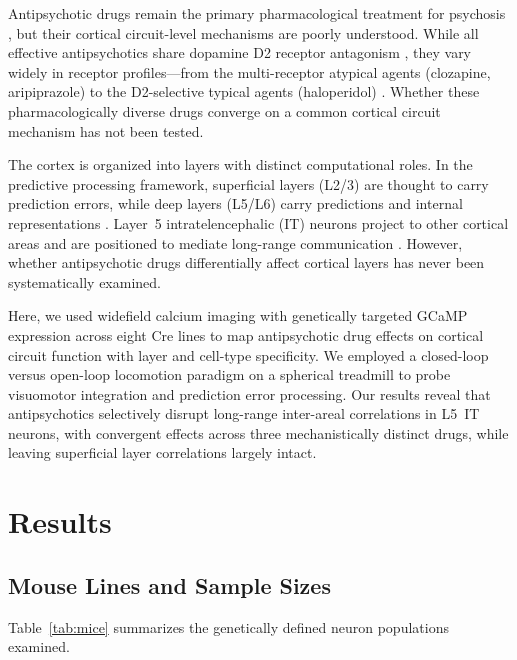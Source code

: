 \documentclass[11pt]{article}
\begin{document}
Antipsychotic drugs remain the primary pharmacological treatment for psychosis \citep{leucht2013comparative}, but their cortical circuit-level mechanisms are poorly understood. While all effective antipsychotics share dopamine D2 receptor antagonism \citep{creese1976dopamine, seeman2006targeting}, they vary widely in receptor profiles---from the multi-receptor atypical agents (clozapine, aripiprazole) to the D2-selective typical agents (haloperidol) \citep{meltzer2013role, howes2012dopamine}. Whether these pharmacologically diverse drugs converge on a common cortical circuit mechanism has not been tested.

The cortex is organized into layers with distinct computational roles. In the predictive processing framework, superficial layers (L2/3) are thought to carry prediction errors, while deep layers (L5/L6) carry predictions and internal representations \citep{keller2018predictive}. Layer~5 intratelencephalic (IT) neurons project to other cortical areas and are positioned to mediate long-range communication \citep{harris2019hierarchical}. However, whether antipsychotic drugs differentially affect cortical layers has never been systematically examined.

Here, we used widefield calcium imaging with genetically targeted GCaMP expression across eight Cre lines to map antipsychotic drug effects on cortical circuit function with layer and cell-type specificity. We employed a closed-loop versus open-loop locomotion paradigm on a spherical treadmill to probe visuomotor integration and prediction error processing. Our results reveal that antipsychotics selectively disrupt long-range inter-areal correlations in L5~IT neurons, with convergent effects across three mechanistically distinct drugs, while leaving superficial layer correlations largely intact.

\section{Results}

\subsection{Mouse Lines and Sample Sizes}

Table~\ref{tab:mice} summarizes the genetically defined neuron populations examined.
\end{document}
